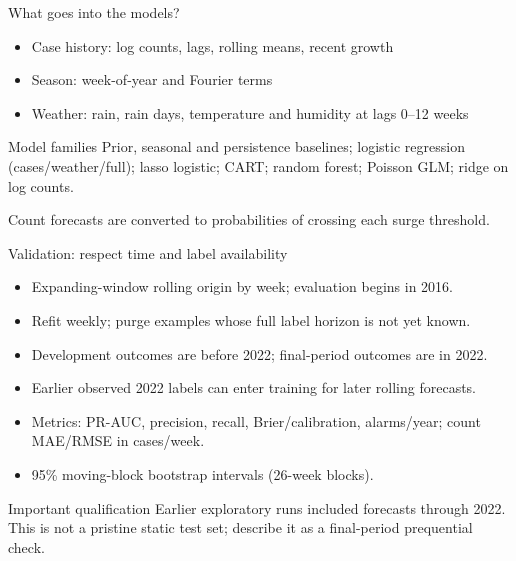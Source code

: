 \documentclass[aspectratio=169,11pt]{beamer}
\begin{document}
\begin{frame}{What goes into the models?}
  \begin{itemize}
    \item Case history: log counts, lags, rolling means, recent growth
    \item Season: week-of-year and Fourier terms
    \item Weather: rain, rain days, temperature and humidity at lags 0--12 weeks
  \end{itemize}
  \begin{block}{Model families}
    Prior, seasonal and persistence baselines; logistic regression (cases/weather/full);
    lasso logistic; CART; random forest; Poisson GLM; ridge on log counts.
  \end{block}
  Count forecasts are converted to probabilities of crossing each surge threshold.
\end{frame}

\begin{frame}{Validation: respect time and label availability}
  \begin{itemize}
    \item Expanding-window rolling origin by week; evaluation begins in 2016.
    \item Refit weekly; purge examples whose full label horizon is not yet known.
    \item Development outcomes are before 2022; final-period outcomes are in 2022.
    \item Earlier observed 2022 labels can enter training for later rolling forecasts.
    \item Metrics: PR-AUC, precision, recall, Brier/calibration, alarms/year;
    count MAE/RMSE in cases/week.
    \item 95\% moving-block bootstrap intervals (26-week blocks).
  \end{itemize}
  \begin{alertblock}{Important qualification}
    Earlier exploratory runs included forecasts through 2022. This is not a pristine
    static test set; describe it as a final-period prequential check.
  \end{alertblock}
\end{frame}
\end{document}
